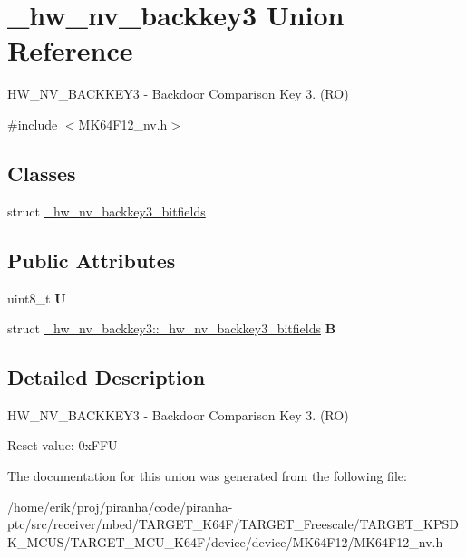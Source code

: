 \hypertarget{union__hw__nv__backkey3}{}\section{\+\_\+hw\+\_\+nv\+\_\+backkey3 Union Reference}
\label{union__hw__nv__backkey3}


H\+W\+\_\+\+N\+V\+\_\+\+B\+A\+C\+K\+K\+E\+Y3 -\/ Backdoor Comparison Key 3. (RO)  




{\ttfamily \#include $<$M\+K64\+F12\+\_\+nv.\+h$>$}

\subsection*{Classes}
\begin{DoxyCompactItemize}
\item 
struct \hyperlink{struct__hw__nv__backkey3_1_1__hw__nv__backkey3__bitfields}{\+\_\+hw\+\_\+nv\+\_\+backkey3\+\_\+bitfields}
\end{DoxyCompactItemize}
\subsection*{Public Attributes}
\begin{DoxyCompactItemize}
\item 
uint8\+\_\+t {\bfseries U}\hypertarget{union__hw__nv__backkey3_a5d2795ac3e5d7f9b0d812b1da3283576}{}\label{union__hw__nv__backkey3_a5d2795ac3e5d7f9b0d812b1da3283576}

\item 
struct \hyperlink{struct__hw__nv__backkey3_1_1__hw__nv__backkey3__bitfields}{\+\_\+hw\+\_\+nv\+\_\+backkey3\+::\+\_\+hw\+\_\+nv\+\_\+backkey3\+\_\+bitfields} {\bfseries B}\hypertarget{union__hw__nv__backkey3_aaafc2c623afe1a721c4986b8162c10e1}{}\label{union__hw__nv__backkey3_aaafc2c623afe1a721c4986b8162c10e1}

\end{DoxyCompactItemize}


\subsection{Detailed Description}
H\+W\+\_\+\+N\+V\+\_\+\+B\+A\+C\+K\+K\+E\+Y3 -\/ Backdoor Comparison Key 3. (RO) 

Reset value\+: 0x\+F\+FU 

The documentation for this union was generated from the following file\+:\begin{DoxyCompactItemize}
\item 
/home/erik/proj/piranha/code/piranha-\/ptc/src/receiver/mbed/\+T\+A\+R\+G\+E\+T\+\_\+\+K64\+F/\+T\+A\+R\+G\+E\+T\+\_\+\+Freescale/\+T\+A\+R\+G\+E\+T\+\_\+\+K\+P\+S\+D\+K\+\_\+\+M\+C\+U\+S/\+T\+A\+R\+G\+E\+T\+\_\+\+M\+C\+U\+\_\+\+K64\+F/device/device/\+M\+K64\+F12/M\+K64\+F12\+\_\+nv.\+h\end{DoxyCompactItemize}
